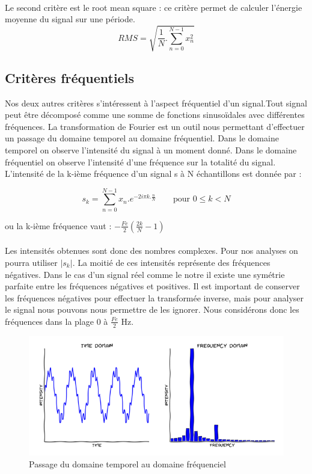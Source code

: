 \documentclass[soumission]{ir}
\begin{document}
\paragraph{}
Le second critère est le root mean square : ce critère permet de calculer l'énergie moyenne du signal sur 
une période.
\begin{equation}
    RMS = \sqrt{\frac{1}{N}.\sum_{n = 0}^{N-1} x_n^2}
\end{equation}

\subsection{Critères fréquentiels}
Nos deux autres critères s’intéressent à l’aspect fréquentiel d’un signal.Tout signal peut être décomposé 
comme une somme de fonctions sinusoïdales avec différentes fréquences. La transformation de Fourier est un 
outil nous permettant d’effectuer un passage du domaine temporel au domaine fréquentiel. Dans le domaine 
temporel on observe l’intensité du signal à un moment donné. Dans le domaine fréquentiel on observe 
l’intensité d’une fréquence sur la totalité du signal. L’intensité de la  k-ième fréquence d’un signal s à N 
échantillons est donnée par :

\begin{equation}
    s_k = \sum_{n = 0}^{N-1} x_n.e^{-2 i \pi k. \frac{n}{N}}
    \qquad\text{pour $0 \leqslant k < N$}
\end{equation}

ou la k-ième fréquence vaut : $-\frac{Fe}{2} (\frac{2k}{N} - 1)$

\paragraph{}
Les intensités obtenues sont donc des nombres complexes. Pour nos analyses on pourra utiliser $|s_k|$. La 
moitié de ces intensités représente des fréquences négatives. Dans le cas d'un signal réel comme le notre 
il existe une symétrie parfaite entre les fréquences négatives et positives. Il est important de conserver 
les fréquences négatives pour effectuer la transformée inverse, mais pour analyser le signal nous pouvons 
nous permettre de les ignorer. Nous considérons donc les fréquences dans la plage 0 à $\frac{Fe}{2}$ Hz.

\begin{figure}[ht]
    \centering
    \includegraphics[scale=0.7]{images/Fourier.png}
    \caption{Passage du domaine temporel au domaine fréquenciel}
    \label{ex_Fourier}
\end{figure}
\end{document}
